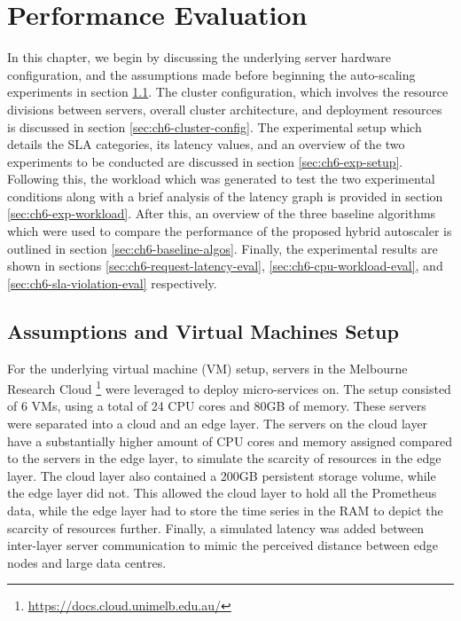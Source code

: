 \clearpage

\def\chaptertitle{Performance Evaluation}

\lhead{\emph{\chaptertitle}}

\chapter{\chaptertitle}
\label{ch:performance-evaluation}

In this chapter, we begin by discussing the underlying server hardware configuration, and the assumptions made before beginning the auto-scaling experiments in section \ref{sec:ch6-hardware-assumptions}. The cluster configuration, which involves the resource divisions between servers, overall cluster architecture, and deployment resources is discussed in section \ref{sec:ch6-cluster-config}. The experimental setup which details the SLA categories, its latency values, and an overview of the two experiments to be conducted are discussed in section \ref{sec:ch6-exp-setup}. Following this, the workload which was generated to test the two experimental conditions along with a brief analysis of the latency graph is provided in section \ref{sec:ch6-exp-workload}. After this, an overview of the three baseline algorithms which were used to compare the performance of the proposed hybrid autoscaler is outlined in section \ref{sec:ch6-baseline-algos}. Finally, the experimental results are shown in sections \ref{sec:ch6-request-latency-eval}, \ref{sec:ch6-cpu-workload-eval}, and \ref{sec:ch6-sla-violation-eval} respectively.

\section{Assumptions and Virtual Machines Setup}
\label{sec:ch6-hardware-assumptions}

For the underlying virtual machine (VM) setup, servers in the Melbourne Research Cloud \footnote{\url{https://docs.cloud.unimelb.edu.au/}} were leveraged to deploy micro-services on. The setup consisted of 6 VMs, using a total of 24 CPU cores and 80GB of memory. These servers were separated into a cloud and an edge layer. The servers on the cloud layer have a substantially higher amount of CPU cores and memory assigned compared to the servers in the edge layer, to simulate the scarcity of resources in the edge layer. The cloud layer also contained a 200GB persistent storage volume, while the edge layer did not. This allowed the cloud layer to hold all the Prometheus data, while the edge layer had to store the time series in the RAM to depict the scarcity of resources further. Finally, a simulated latency was added between inter-layer server communication to mimic the perceived distance between edge nodes and large data centres.\par

